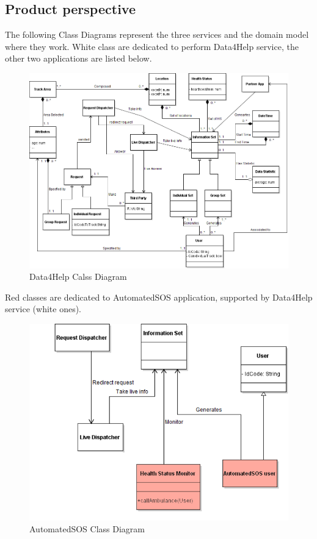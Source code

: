 \subsection{Product perspective}
\begin{minipage}{\textwidth}
The following Class Diagrams represent the three services and the domain model where they work.
White class are dedicated to perform Data4Help service, the other two applications are listed below.
\begin{figure}[H]
\includegraphics[scale=0.45]{Images/Class_Data4Help.png}
\caption{Data4Help Calss Diagram}
\end{figure}
\bigbreak
{\color{Salmon} Red classes} are dedicated to {\color{Salmon} AutomatedSOS} application, supported by Data4Help service (white ones).
\begin{figure}[H]
\centering
\includegraphics[scale=0.50]{Images/Class_AutoSOS.png}
\caption{AutomatedSOS Class Diagram}
\end{figure}
\end{minipage}

